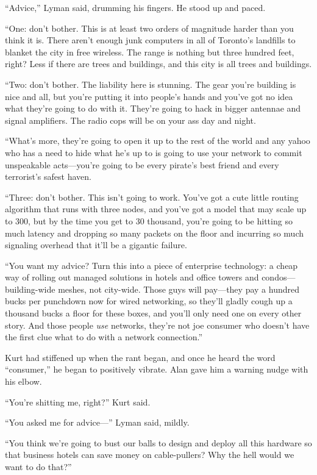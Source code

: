 ``Advice,'' Lyman said, drumming his fingers.  He stood up and paced.

``One:  don't bother.  This is at least two orders of magnitude harder
than you think it is.  There aren't enough junk computers in all of
Toronto's landfills to blanket the city in free wireless.  The range
is nothing but three hundred feet, right?  Less if there are trees and
buildings, and this city is all trees and buildings.

``Two:  don't bother.  The liability here is stunning.  The gear
you're building is nice and all, but you're putting it into people's
hands and you've got no idea what they're going to do with it. 
They're going to hack in bigger antennae and signal amplifiers.  The
radio cops will be on your ass day and night.

``What's more, they're going to open it up to the rest of the world
and any yahoo who has a need to hide what he's up to is going to use
your network to commit unspeakable acts---you're going to be every
pirate's best friend and every terrorist's safest haven.

``Three:  don't bother.  This isn't going to work.  You've got a cute
little routing algorithm that runs with three nodes, and you've got a
model that may scale up to 300, but by the time you get to 30
thousand, you're going to be hitting so much latency and dropping so
many packets on the floor and incurring so much signaling overhead
that it'll be a gigantic failure.

``You want my advice?  Turn this into a piece of enterprise
technology:  a cheap way of rolling out managed solutions in hotels
and office towers and condos---building-wide meshes, not city-wide. 
Those guys will pay---they pay a hundred bucks per punchdown now for
wired networking, so they'll gladly cough up a thousand bucks a floor
for these boxes, and you'll only need one on every other story.  And
those people \textit{use} networks, they're not joe consumer who
doesn't have the first clue what to do with a network connection.''

Kurt had stiffened up when the rant began, and once he heard the word
``consumer,'' he began to positively vibrate.  Alan gave him a warning
nudge with his elbow.

``You're shitting me, right?'' Kurt said.

``You asked me for advice---'' Lyman said, mildly.

``You think we're going to bust our balls to design and deploy all
this hardware so that business hotels can save money on cable-pullers? 
Why the hell would we want to do that?''

